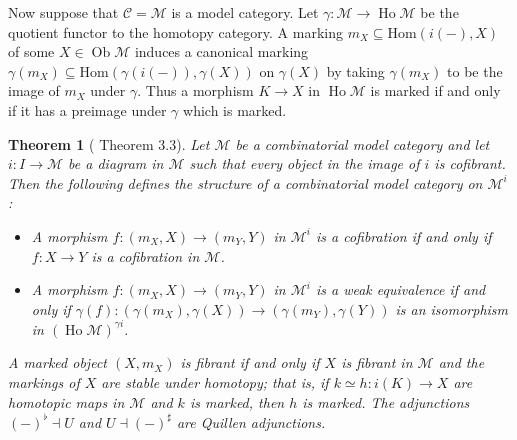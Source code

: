 \documentclass[a4paper]{article}
\newtheorem{theorem}{Theorem}
\theoremstyle{remark}
\theoremstyle{definition}
\begin{document}
Now suppose that $\mathcal{C} = \mathcal{M}$ is a model category.
Let $\gamma : \mathcal{M} \rightarrow \operatorname{Ho} \mathcal{M}$ be the quotient functor to the homotopy category.
A marking $m_X \subseteq \mathrm{Hom}(i(-), X)$ of some $X \in \operatorname{Ob} \mathcal{M}$ induces a canonical marking $\gamma(m_X) \subseteq \mathrm{Hom}(\gamma(i(-)), \gamma(X))$ on $\gamma(X)$ by taking $\gamma(m_X)$ to be the image of $m_X$ under $\gamma$.
Thus a morphism $K \rightarrow X$ in $\operatorname{Ho} \mathcal{M}$ is marked if and only if it has a preimage under $\gamma$ which is marked.

\begin{theorem}[\citet{marked-objects} Theorem 3.3]
  \label{th:marked-model-category}
  Let $\mathcal{M}$ be a combinatorial model category and let $i : I \rightarrow \mathcal{M}$ be a diagram in $\mathcal{M}$ such that every object in the image of $i$ is cofibrant.
  Then the following defines the structure of a combinatorial model category on $\mathcal{M}^i$:
  \begin{itemize}
    \item
      A morphism $f : (m_X, X) \rightarrow (m_Y, Y)$ in $\mathcal{M}^i$ is a cofibration if and only if $f : X \rightarrow Y$ is a cofibration in $\mathcal{M}$.
    \item
      A morphism $f : (m_X, X) \rightarrow (m_Y, Y)$ in $\mathcal{M}^i$ is a weak equivalence if and only if $\gamma(f) : (\gamma(m_X), \gamma(X)) \rightarrow (\gamma(m_Y), \gamma(Y))$ is an isomorphism in $(\operatorname{Ho} \mathcal{M})^{\gamma i}$.
  \end{itemize}
  A marked object $(X, m_X)$ is fibrant if and only if $X$ is fibrant in $\mathcal{M}$ and the markings of $X$ are stable under homotopy; that is, if $k \simeq h : i(K) \rightarrow X$ are homotopic maps in $\mathcal{M}$ and $k$ is marked, then $h$ is marked.
  The adjunctions $(-)^\flat \dashv U$ and $U \dashv (-)^\sharp$ are Quillen adjunctions.
\end{theorem}
\end{document}
